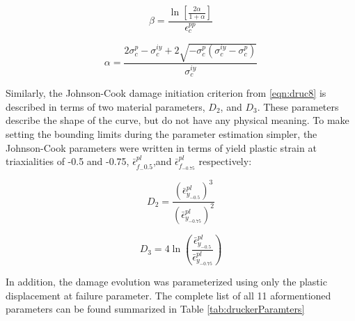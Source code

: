 \begin{equation}
\beta=\frac{\ln\left[\frac{2\alpha}{1+\alpha} \right ]}{\epsilon_c^{pp}}
\label{eqn:param2-2}
\end{equation}

\begin{equation}
\alpha =\frac{2\sigma_c^{p}-\sigma_c^{iy}+2\sqrt{-\sigma_c^p\left(\sigma_c^{iy}-\sigma_c^p \right )}}{\sigma_c^{iy}}
\label{eqn:param2-3}
\end{equation}


Similarly, the Johnson-Cook damage initiation criterion from \ref{eqn:druc8} is described in terms of two material parameters, $D_2$, and $D_3$. These parameters describe the shape of the curve, but do not have any physical meaning. To make setting the bounding limits during the parameter estimation simpler, the Johnson-Cook parameters were written in terms of yield plastic strain at triaxialities of -0.5 and -0.75, $\bar{\epsilon}^{pl}_{f_-0.5}$,and $\bar{\epsilon}^{pl}_{f_{-0.75}}$ respectively:

\begin{equation}
D_2=\frac{\left(\bar{\epsilon}^{pl}_{y_{-0.5}}\right)^3}{\left(\bar{\epsilon}^{pl}_{y_{-0.75}}\right)^2}
\label{eqn:dparam8}
\end{equation}

\begin{equation}
D_3=4\ln \left (\frac{\bar{\epsilon}^{pl}_{y_{-0.5}}}{\bar{\epsilon}^{pl}_{y_{-0.75}}}\right )
\label{eqn:dparam9}
\end{equation}

In addition, the damage evolution was parameterized using only the plastic displacement at failure parameter. The complete list of all 11 aformentioned parameters can be found summarized in Table \ref{tab:druckerParamters}

